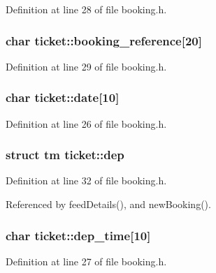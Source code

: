 Definition at line 28 of file booking.\+h.

\hypertarget{structticket_adbddfa1cf9fa643c6cea63f5ea3006a4}{
\subsubsection[{booking\+\_\+reference}]{\setlength{\rightskip}{0pt plus 5cm}char ticket\+::booking\+\_\+reference\mbox{[}20\mbox{]}}}\label{structticket_adbddfa1cf9fa643c6cea63f5ea3006a4}


Definition at line 29 of file booking.\+h.

\hypertarget{structticket_ae4d2e27c920650bc6325d0e81cf829d9}{
\subsubsection[{date}]{\setlength{\rightskip}{0pt plus 5cm}char ticket\+::date\mbox{[}10\mbox{]}}}\label{structticket_ae4d2e27c920650bc6325d0e81cf829d9}


Definition at line 26 of file booking.\+h.

\hypertarget{structticket_a4bd2f22d43528cbdd9b4cc1d4ea5754f}{
\subsubsection[{dep}]{\setlength{\rightskip}{0pt plus 5cm}struct tm ticket\+::dep}}\label{structticket_a4bd2f22d43528cbdd9b4cc1d4ea5754f}


Definition at line 32 of file booking.\+h.



Referenced by feed\+Details(), and new\+Booking().

\hypertarget{structticket_a5551ea610d8edcc9716180b2c97ccde4}{
\subsubsection[{dep\+\_\+time}]{\setlength{\rightskip}{0pt plus 5cm}char ticket\+::dep\+\_\+time\mbox{[}10\mbox{]}}}\label{structticket_a5551ea610d8edcc9716180b2c97ccde4}


Definition at line 27 of file booking.\+h.

